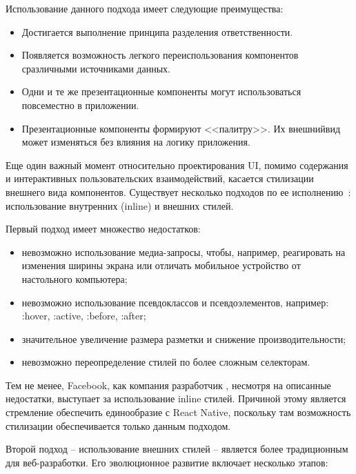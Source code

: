 Использование данного подхода имеет следующие преимущества:

\begin{itemize}
	\item Достигается выполнение принципа разделения ответственности.
	\item Появляется возможность легкого переиспользования компонентов с\linebreak различными источниками данных.
	\item Одни и те же презентационные компоненты могут использоваться повсеместно в приложении.
	\item Презентационные компоненты формируют <<палитру>>. Их внешний\linebreak вид может изменяться без влияния на логику приложения.
\end{itemize}

Еще один важный момент относительно проектирования UI, помимо содержания и интерактивных пользовательских взаимодействий, касается стилизации внешнего вида компонентов. Существует несколько подходов по ее исполнению~\cite{styling_react}: использование внутренних (inline) и внешних стилей.

Первый подход имеет множество недостатков:

\begin{itemize}
	\item невозможно использование медиа-запросы, чтобы, например, реагировать на изменения ширины экрана или отличать мобильное устройство от настольного компьютера;
	\item невозможно использование псевдоклассов и псевдоэлементов, например: :hover, :active, :before, :after;
	\item значительное увеличение размера разметки и снижение производительности;
	\item невозможно переопределение стилей по более сложным селекторам.
\end{itemize}

Тем не менее, Facebook, как компания разработчик \react, несмотря на описанные недостатки, выступает за использование inline стилей. Причиной этому является стремление обеспечить единообразие с React Native, поскольку там возможность стилизации обеспечивается только данным подходом.

Второй подход -- использование внешних стилей -- является более традиционным для веб-разработки. Его эволюционное развитие включает несколько этапов:

